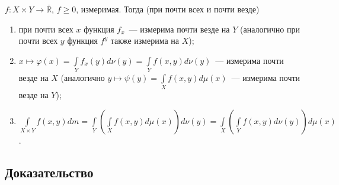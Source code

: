 \documentclass{article}
\begin{document}
        $f : X \times Y \rightarrow \overline{\mathbb{R}}$, $f \geqslant 0$, измеримая. Тогда (при почти всех и почти везде)
        
        \begin{enumerate}
        
            \item при почти всех $x$ функция $f_x$~--- измерима почти везде на $Y$ (аналогично при почти всех $y$ функция $f^y$ также измерима на $X$);
            
            \item $x \mapsto \varphi(x) = \int\limits_Y f_x(y) d \nu (y) = \int\limits_Y f(x, y) d \nu (y)$~--- измерима почти везде на $X$ (аналогично $y \mapsto \psi(y) = \int\limits_X f(x, y) d \mu(x)$~--- измерима почти везде на $Y$);
            
            \item $\int\limits_{X \times Y} f(x, y) d m = \int\limits_{Y} \left( \int\limits_{X} f (x, y) d \mu (x) \right) d \nu (y) = \int\limits_X \left( \int\limits_Y f(x, y) d \nu (y) \right) d \mu (x)$.
            
        \end{enumerate}
        
        \subsection{Доказательство}
        
\end{document}
